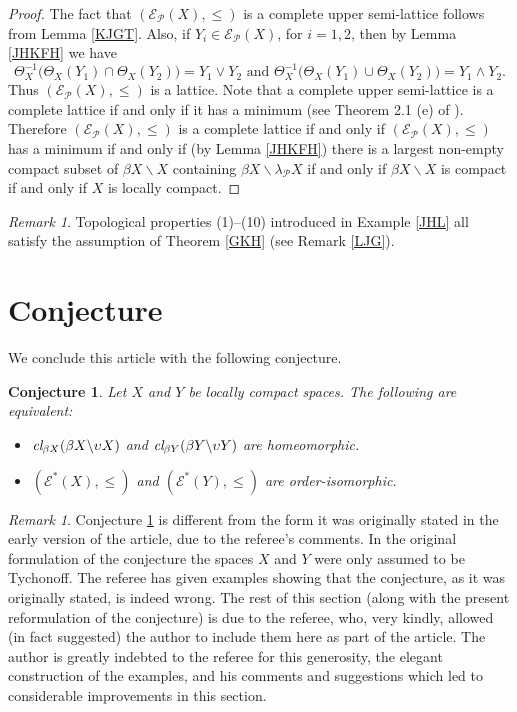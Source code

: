 \documentclass{amsart}
\newtheorem{conjecture}[theorem]{Conjecture}
\theoremstyle{definition}
\theoremstyle{remark}
\newtheorem{remark}[theorem]{Remark}
\theoremstyle{notation}
\numberwithin{equation}{section}
\begin{document}
\begin{proof}
The fact that $({\mathscr E}_{{\mathcal P}}(X),\leq)$ is a complete upper semi-lattice follows from Lemma \ref{KJGT}. Also,
if $Y_i\in {\mathscr E}_{{\mathcal P}}(X)$, for $i=1,2$, then by Lemma \ref{JHKFH} we have
\[\Theta_X^{-1}\big(\Theta_X(Y_1)\cap\Theta_X(Y_2)\big)=Y_1\vee Y_2\mbox{ and }\Theta_X^{-1}\big(\Theta_X(Y_1)\cup\Theta_X(Y_2)\big)=Y_1\wedge Y_2.\]
Thus $({\mathscr E}_{{\mathcal P}}(X),\leq)$ is a lattice.  Note that a complete upper semi-lattice is a complete lattice if and
only if it has a minimum (see Theorem 2.1 (e) of \cite{PW}). Therefore $({\mathscr E}_{{\mathcal P}}(X),\leq)$ is a complete lattice if and only if
$({\mathscr E}_{{\mathcal P}}(X),\leq)$  has a minimum if and only if (by Lemma \ref{JHKFH}) there is a largest non-empty compact subset of
$\beta X\backslash X$ containing $\beta X\backslash\lambda_{{\mathcal P}} X$ if and only if $\beta X\backslash X$ is compact if and only if $X$ is
locally compact.
\end{proof}

\begin{remark}\label{HKHGD}
Topological properties (1)--(10) introduced in Example \ref{JHL} all satisfy the assumption of Theorem \ref{GKH} (see Remark \ref{LJG}).
\end{remark}

\section{Conjecture}

We conclude this article with the following conjecture.

\begin{conjecture}\label{HGFGKH}
Let $X$ and $Y$ be locally compact spaces. The following are equivalent:
\begin{itemize}
\item[\rm(1)] $\mbox{\em cl}_{\beta X}(\beta X\backslash\upsilon X)$ and $\mbox{\em cl}_{\beta Y}(\beta Y\backslash\upsilon Y)$ are homeomorphic.
\item[\rm(2)] $({\mathscr E}^*(X),\leq)$ and $({\mathscr E}^*(Y),\leq)$ are order-isomorphic.
\end{itemize}
\end{conjecture}

\begin{remark}\label{POGOHD}
Conjecture \ref{HGFGKH} is different from the form it was originally stated in the early version of the article, due to the referee's comments. In the original formulation of the conjecture the spaces $X$ and $Y$ were only assumed to be Tychonoff. The referee has given examples showing that the conjecture, as it was originally stated, is indeed wrong. The rest of this section (along with the present reformulation of the conjecture) is due to the referee, who, very kindly, allowed (in fact suggested) the author to include them here as part of the article. The author is greatly indebted to the referee for this generosity, the elegant construction of the examples, and his comments and suggestions which led to considerable improvements in this section.
\end{remark}
\end{document}
